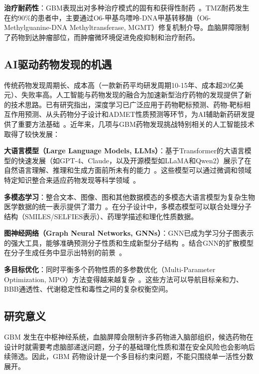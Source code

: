 \textbf{治疗耐药性}：GBM表现出对多种治疗模式的固有和获得性耐药~\cite{Fu2025}。TMZ耐药发生在约90\%的患者中，主要通过O6-甲基鸟嘌呤-DNA甲基转移酶（O6-Methylguanine-DNA Methyltransferase, MGMT）修复机制介导。血脑屏障限制了药物到达肿瘤部位，而肿瘤微环境促进免疫抑制和治疗耐药。

\subsection{AI驱动药物发现的机遇}\label{sec:ai-opportunity}

传统药物发现周期长、成本高（一款新药平均研发周期10-15年、成本超20亿美元）、失败率高。人工智能与药物发现的融合为加速新型治疗药物的发现提供了新的技术思路。已有研究指出，深度学习已广泛应用于药物靶标预测、药物-靶标相互作用预测、从头药物分子设计和ADMET性质预测等环节，为AI辅助新药研发提供了重要方法基础~\cite{戴青青2022}。近年来，几项与GBM药物发现挑战特别相关的人工智能技术取得了较快发展：

\textbf{大语言模型（Large Language Models, LLMs）}：基于Transformer的大语言模型的快速发展（如GPT-4、Claude，以及开源模型如LLaMA和Qwen2）展示了在自然语言理解、推理和生成方面前所未有的能力~\cite{Qwen2Team2024}。这些模型可以通过微调和领域特定知识整合来适应药物发现等科学领域~\cite{jin2025effective}。

\textbf{多模态学习}：整合文本、图像、图和其他数据模态的多模态大语言模型为复杂生物医学数据的统一表示提供了潜力~\cite{Liu2024GITMol}。在分子设计中，多模态模型可以联合处理分子结构（SMILES/SELFIES表示）、药理学描述和理化性质数据。

\textbf{图神经网络（Graph Neural Networks, GNNs）}：GNN已成为学习分子图表示的强大工具，能够准确预测分子性质和生成新型分子结构~\cite{Xu2019,Gilmer2017}。结合GNN的扩散模型在分子生成任务中显示出特别的前景~\cite{Xu2023}。

\textbf{多目标优化}：同时平衡多个药物性质的多参数优化（Multi-Parameter Optimization, MPO）方法变得越来越复杂~\cite{Zhou2019Exp}。这些方法可以导航目标亲和力、BBB通透性、代谢稳定性和毒性之间的复杂权衡空间。

\subsection{研究意义}\label{sec:research-scope}

GBM 发生在中枢神经系统，血脑屏障会限制许多药物进入脑部组织，候选药物在设计时就需要考虑脑部递送问题，分子的基础理化性质和潜在安全风险也会影响后续筛选。因此，GBM 药物设计是一个多目标约束问题，不能只围绕单一活性分数展开。

